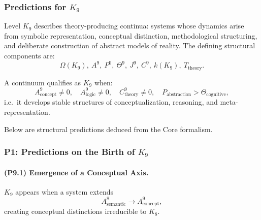 

\subsubsection{Predictions for \texorpdfstring{$K_9$}{K_9}}
\label{sec:predictions-k9}

Level $K_9$ describes theory-producing continua:
systems whose dynamics arise from symbolic representation,
conceptual distinction, methodological structuring,
and deliberate construction of abstract models of reality.
The defining structural components are:
\[
\Omega(K_9),\
A^{9},\
P^{9},\
\Theta^{9},\
J^{9},\
C^{9},\
k(K_9),\
T_{\mathrm{theory}}.
\]

A continuum qualifies as $K_9$ when:
\[
A_{\mathrm{concept}}^9 \neq 0, \quad
A_{\mathrm{logic}}^9 \neq 0, \quad
C_{\mathrm{theory}}^9 \neq 0,
\quad
P_{\mathrm{abstraction}} > \Theta_{\mathrm{cognitive}},
\]
i.e.\ it develops stable structures of conceptualization, reasoning,
and meta-representation.

Below are structural predictions deduced from the Core formalism.

\subsubsection{P1: Predictions on the Birth of \texorpdfstring{$K_9$}{K_9}}

\paragraph{(P9.1) Emergence of a Conceptual Axis.}
$K_9$ appears when a system extends
\[
A_{\mathrm{semantic}}^{8} \to A_{\mathrm{concept}}^{9},
\]
creating conceptual distinctions irreducible to $K_8$.

